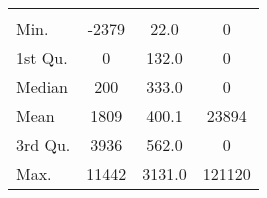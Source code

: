 \begin{tabular}{lS[table-format=5.1]S[table-format=5.1]S[table-format=5.1]}
&  &  &  \\
 Min.    & -2379 & 22.0 & 0 \\
 1st Qu. & 0 & 132.0 & 0 \\
 Median  & 200 & 333.0 & 0 \\
 Mean    & 1809 & 400.1 & 23894 \\
 3rd Qu. & 3936 & 562.0 & 0 \\
 Max.    & 11442 & 3131.0 & 121120 \\
\end{tabular}
